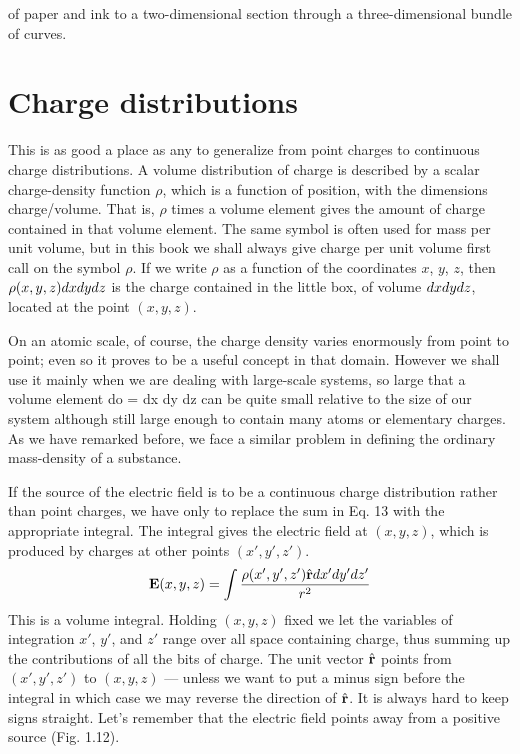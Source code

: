 of paper and ink to a two-dimensional section through a three-dimensional bundle of curves.

\section{Charge distributions}

This is as good a place as any to generalize from point charges to
continuous charge distributions. A volume distribution of charge is
described by a scalar charge-density function $\rho$, which is a function
of position, with the dimensions charge/volume. That is, $\rho$ times a
volume element gives the amount of charge contained in that volume
element. The same symbol is often used for mass per unit volume,
but in this book we shall always give charge per unit volume first
call on the symbol $\rho$. If we write $\rho$ as a function of the coordinates
$x$, $y$, $z$, then $\rho(x,y,z)d x d y d z$ is the charge contained in the little box,
of volume $d x d y d z$, located at the point $(x,y,z)$.

On an atomic scale, of course, the charge density varies enormously
from point to point; even so it proves to be a useful concept
in that domain. However we shall use it mainly when we are dealing
with large-scale systems, so large that a volume element do =
dx dy dz can be quite small relative to the size of our system although
still large enough to contain many atoms or elementary charges.
As we have remarked before, we face a similar problem in defining
the ordinary mass-density of a substance.

If the source of the electric field is to be a continuous charge distribution
rather than point charges, we have only to replace the sum
in Eq. 13 with the appropriate integral. The integral gives the electric
field at $(x,y,z)$, which is produced by charges at other points
$(x',y',z')$.
\begin{equation}
  \mathbf{E}(x,y,z) = \int \frac{\rho(x',y',z')\hat{\mathbf{r}}d x' d y' d z'}{r^2}
\end{equation}
This is a volume integral. Holding $(x,y,z)$ fixed we let the variables
of integration $x'$, $y'$, and $z'$ range over all space containing charge,
thus summing up the contributions of all the bits of charge. The
unit vector $\hat{\mathbf{r}}$ points from $(x', y', z')$ to $(x,y,z)$ --- 
unless we want to put
a minus sign before the integral in which case we may reverse the
direction of $\hat{\mathbf{r}}$. It is always hard to keep signs straight. Let's remember
that the electric field points away from a positive source
(Fig. 1.12).

